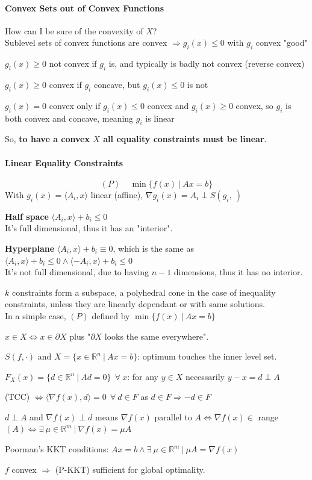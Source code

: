 \documentclass[10pt]{report}
\begin{document}
\paragraph{Convex Sets out of Convex Functions} How can I be sure of the convexity of $X$?\\
Sublevel sets of convex functions are convex $\Rightarrow g_i(x)\leq 0$ with $g_i$ convex "good"\begin{list}{}{}
	\item $g_i(x) \geq 0$ not convex if $g_i$ is, and typically is badly not convex (reverse convex)
	\item $g_i(x) \geq 0$ convex if $g_i$ concave, but $g_i(x) \leq 0$ is not
	\item $g_i(x) = 0$ convex only if $g_i(x)\leq 0$ convex and $g_i(x) \geq 0$ convex, so $g_i$ is both convex and concave, meaning $g_i$ is linear
\end{list}
So, \textbf{to have a convex $X$ all equality constraints must be linear}.
\paragraph{Linear Equality Constraints} $$(P)\:\:\:\:\:\min\{f(x)\:|\:Ax=b\}$$
With $g_i(x) = \langle A_i, x\rangle$ linear (affine), $\nabla g_i(x) = A_i \perp S(g_i,\:)$
\begin{list}{}{}
	\item \textbf{Half space} $\langle A_i, x\rangle + b_i\leq 0$\\
	It's full dimensional, thus it has an "interior".
	\item \textbf{Hyperplane} $\langle A_i, x\rangle + b_i\equiv 0$, which is the same as $\langle A_i, x\rangle + b_i\leq 0\land \langle -A_i, x\rangle + b_i\leq 0$\\
	It's not full dimensional, due to having $n-1$ dimensions, thus it has no interior.
\end{list}
$k$ constraints form a subspace, a polyhedral cone in the case of inequality constraints, unless they are linearly dependant or with same solutions.\\
In a simple case, $(P)$ defined by $\min\{f(x)\:|\:Ax=b\}$
\begin{list}{}{}
	\item $x\in X \Leftrightarrow x\in \partial X$ plus "$\partial X$ looks the same everywhere".
	\item $S(f,\cdot)$ and $X=\{x\in \mathbb{R}^n\:|\:Ax=b\}$: optimum touches the inner level set.
	\item $F_X(x) = \{d\in \mathbb{R}^n\:|\:Ad=0\}\:\:\forall\:x$: for any $y\in X$ necessarily $y-x = d\perp A$
	\item (TCC) $\Leftrightarrow \langle\nabla f(x),d\rangle = 0\:\:\forall\:d\in F$ as $d\in F\Rightarrow -d\in F$
	\item $d\perp A$ and $\nabla f(x)\perp d$ means $\nabla f(x)$ parallel to $A\Leftrightarrow\nabla f(x)\in $ range$(A)\Leftrightarrow\exists\:\mu\in \mathbb{R}^m\:|\:\nabla f(x) = \mu A$
	\item Poorman's KKT conditions: $Ax = b \wedge \exists\:\mu\in \mathbb{R}^m\:|\:\mu A = \nabla f(x)$
	\item $f$ convex $\Rightarrow$ (P-KKT) sufficient for global optimality.
\end{list}
\end{document}

